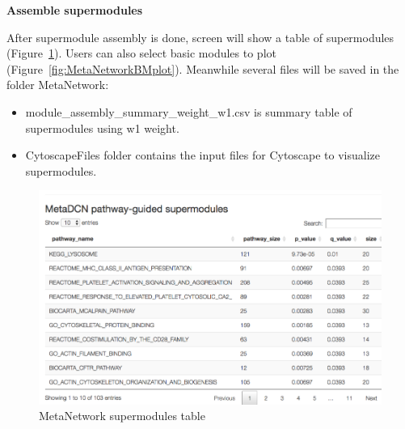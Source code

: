 \textbf{Assemble supermodules}

After supermodule assembly is done, screen will show a table of supermodules (Figure~\ref{fig:MetaNetworksuper}). Users can also select basic modules to plot (Figure~\ref{fig:MetaNetworkBMplot}). Meanwhile several files will be saved in the folder MetaNetwork:
\begin{itemize}
\item module\_assembly\_summary\_weight\_w1.csv is summary table of supermodules using w1 weight.
\item CytoscapeFiles folder contains the input files for Cytoscape to visualize supermodules.
\end{itemize}

\begin{figure}[H]
\begin{center}
\includegraphics[scale=0.7]{./figure/MetaNetwork/MetaNetworksuper.png}
\caption{MetaNetwork supermodules table}
\label{fig:MetaNetworksuper}
\end{center}
\end{figure}

